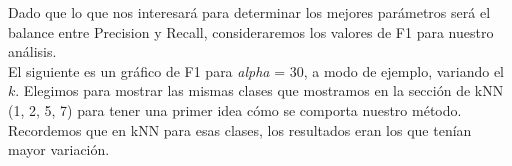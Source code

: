 Dado que lo que nos interesará para determinar los mejores parámetros será el balance entre Precision y Recall, consideraremos los valores de F1 para nuestro análisis.  \\

El siguiente es un gráfico de F1 para \textit{alpha} = 30, a modo de ejemplo, variando el $k$. Elegimos para mostrar las mismas clases que mostramos en la sección de kNN (1, 2, 5, 7) para tener una primer idea cómo se comporta nuestro método. Recordemos que en kNN para esas clases, los resultados eran los que tenían mayor variación. \\




$ $\newline

